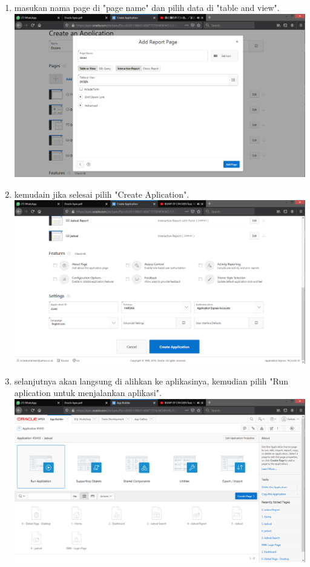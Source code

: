 \documentclass[12pt]{article}
\begin{document}
\begin{enumerate}
		\item masukan nama page di "page name" dan pilih data di "table and view".\\
		\includegraphics[scale=0.3]{src/16}
		\item kemudain jika selesai pilih "Create Aplication".\\
		\includegraphics[scale=0.3]{src/18}
		\item selanjutnya akan langsung di alihkan ke aplikasinya, kemudian pilih "Run aplication untuk menjalankan aplikasi".\\
		\includegraphics[scale=0.3]{src/19}

\end{enumerate}
\end{document}
